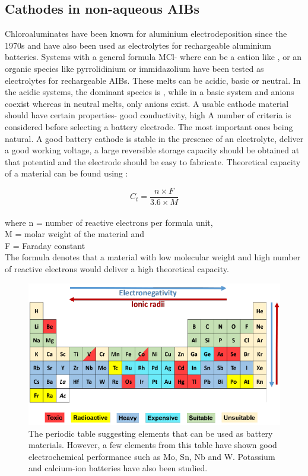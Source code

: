 {\subsection{Cathodes in non-aqueous AIBs}
Chloroaluminates have been known for aluminium electrodeposition since the 1970s and have also been used as electrolytes for rechargeable aluminium batteries. Systems with a general formula MCl- where  can be a cation like ,  or an organic species like pyrrolidinium or immidazolium have been tested as electrolytes for rechargeable AIBs. These melts can be acidic, basic or neutral. In the acidic systems, the dominant species is , while in a basic system  and  anions coexist whereas in neutral melts, only  anions exist. A usable cathode material should have certain properties- good conductivity, high A number of criteria is considered before selecting a battery electrode. The most important ones being natural. A good battery cathode is stable in the presence of an electrolyte, deliver a good working voltage, a large reversible storage capacity should be obtained at that potential and the electrode should be easy to fabricate. 
Theoretical capacity of a material can be found using :

\begin{equation} \label{eq3}
    C_{t}= \frac{n \times F}{3.6 \times M}
\end{equation}\\
where n = number of reactive electrons per formula unit,\\
M = molar weight of the material and\\
F = Faraday constant\\

The formula denotes that a material with low molecular weight and high number of reactive electrons would deliver a high theoretical capacity.

\begin{figure}[h!]
\centering
\includegraphics[width=\textwidth]{Figures/chap1fig/pertab}
\caption{The periodic table suggesting elements that can be used as battery materials. However, a few elements from this table have shown good electrochemical performance such as Mo, Sn, Nb and W. Potassium and calcium-ion batteries have also been studied.}
\label{Figures/chap1fig:pertab}
\end{figure}

}
